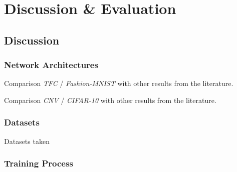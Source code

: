 \chapter{Discussion \& Evaluation} %

\label{Chapter8} %



\section{Discussion}


\subsection{Network Architectures}

Comparison \emph{TFC} / \emph{Fashion-MNIST} with other results from the literature.

Comparison \emph{CNV} / \emph{CIFAR-10} with other results from the literature.


\subsection{Datasets}

Datasets taken



\subsection{Training Process}

